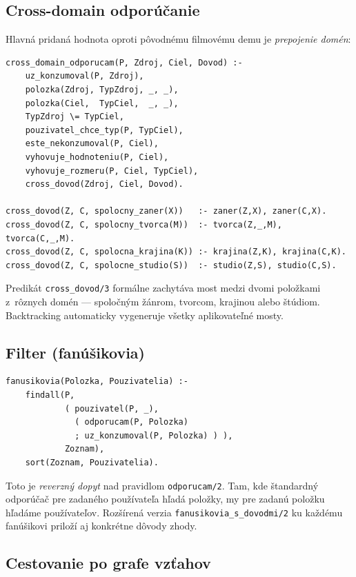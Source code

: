 \documentclass[11pt,a4paper]{article}
\begin{document}
\subsection{Cross-domain odporúčanie}

Hlavná pridaná hodnota oproti pôvodnému filmovému demu je
\emph{prepojenie domén}:

\begin{lstlisting}
cross_domain_odporucam(P, Zdroj, Ciel, Dovod) :-
    uz_konzumoval(P, Zdroj),
    polozka(Zdroj, TypZdroj, _, _),
    polozka(Ciel,  TypCiel,  _, _),
    TypZdroj \= TypCiel,
    pouzivatel_chce_typ(P, TypCiel),
    este_nekonzumoval(P, Ciel),
    vyhovuje_hodnoteniu(P, Ciel),
    vyhovuje_rozmeru(P, Ciel, TypCiel),
    cross_dovod(Zdroj, Ciel, Dovod).

cross_dovod(Z, C, spolocny_zaner(X))   :- zaner(Z,X), zaner(C,X).
cross_dovod(Z, C, spolocny_tvorca(M))  :- tvorca(Z,_,M), tvorca(C,_,M).
cross_dovod(Z, C, spolocna_krajina(K)) :- krajina(Z,K), krajina(C,K).
cross_dovod(Z, C, spolocne_studio(S))  :- studio(Z,S), studio(C,S).
\end{lstlisting}

\noindent
Predikát \texttt{cross\_dovod/3} formálne zachytáva most medzi
dvomi položkami z~rôznych domén --- spoločným žánrom, tvorcom,
krajinou alebo štúdiom. Backtracking automaticky vygeneruje
všetky aplikovateľné mosty.

\subsection{Filter  (fanúšikovia)}

\begin{lstlisting}
fanusikovia(Polozka, Pouzivatelia) :-
    findall(P,
            ( pouzivatel(P, _),
              ( odporucam(P, Polozka)
              ; uz_konzumoval(P, Polozka) ) ),
            Zoznam),
    sort(Zoznam, Pouzivatelia).
\end{lstlisting}

\noindent
Toto je \emph{reverzný dopyt} nad pravidlom \texttt{odporucam/2}.
Tam, kde štandardný odporúčač pre zadaného používateľa hľadá
položky, my pre zadanú položku hľadáme používateľov.
Rozšírená verzia \texttt{fanusikovia\_s\_dovodmi/2} ku každému
fanúšikovi priloží aj konkrétne dôvody zhody.

\subsection{Cestovanie po grafe vzťahov}
\label{sec:graf}
\end{document}
